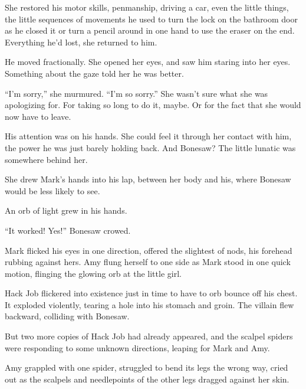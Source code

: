 She restored his motor skills, penmanship, driving a car, even the little things, the little sequences of movements he used to turn the lock on the bathroom door as he closed it or turn a pencil around in one hand to use the eraser on the end.  Everything he'd lost, she returned to him.



He moved fractionally.  She opened her eyes, and saw him staring into her eyes.  Something about the gaze told her he was better.



``I'm sorry,'' she murmured.  ``I'm so sorry.''  She wasn't sure what she was apologizing for.  For taking so long to do it, maybe.  Or for the fact that she would now have to leave.



His attention was on his hands.  She could feel it through her contact with him, the power he was just barely holding back.  And Bonesaw?  The little lunatic was somewhere behind her.



She drew Mark's hands into his lap, between her body and his, where Bonesaw would be less likely to see.



An orb of light grew in his hands.



``It worked!  Yes!'' Bonesaw crowed.



Mark flicked his eyes in one direction, offered the slightest of nods, his forehead rubbing against hers.  Amy flung herself to one side as Mark stood in one quick motion, flinging the glowing orb at the little girl.



Hack Job flickered into existence just in time to have to orb bounce off his chest.  It exploded violently, tearing a hole into his stomach and groin.  The villain flew backward, colliding with Bonesaw.



But two more copies of Hack Job had already appeared, and the scalpel spiders were responding to some unknown directions, leaping for Mark and Amy.



Amy grappled with one spider, struggled to bend its legs the wrong way, cried out as the scalpels and needlepoints of the other legs dragged against her skin.



